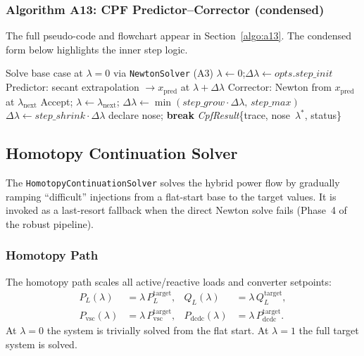 \subsubsection{Algorithm A13: CPF Predictor--Corrector (condensed)}
\label{algo:a13-inline}
The full pseudo-code and flowchart appear in Section~\ref{algo:a13}.
The condensed form below highlights the inner step logic.

\begin{algorithmic}[1]
  \State Solve base case at $\lambda{=}0$ via \texttt{NewtonSolver} (A3)
  \State $\lambda \gets 0$;\quad $\Delta\lambda \gets \mathit{opts.step\_init}$
    \State Predictor: secant extrapolation $\to x_{\mathrm{pred}}$ at $\lambda + \Delta\lambda$
    \State Corrector: Newton from $x_{\mathrm{pred}}$ at $\lambda_{\mathrm{next}}$
      \State Accept; $\lambda \gets \lambda_{\mathrm{next}}$;\quad
        $\Delta\lambda \gets \min(\mathit{step\_grow}\cdot\Delta\lambda,\,\mathit{step\_max})$
    \Else
      \State $\Delta\lambda \gets \mathit{step\_shrink}\cdot\Delta\lambda$
       declare nose; \textbf{break} \EndIf
    \EndIf
  \EndWhile
  \State \Return \textit{CpfResult}\{trace, nose~$\lambda^*$, status\}
\EndProcedure
\end{algorithmic}

\subsection{Homotopy Continuation Solver}
\label{sec:homotopy}

The \texttt{HomotopyContinuationSolver} solves the hybrid power flow by
gradually ramping ``difficult'' injections from a flat-start base to the target
values.  It is invoked as a last-resort fallback when the direct Newton solve
fails (Phase~4 of the robust pipeline).

\subsubsection{Homotopy Path}

The homotopy path scales all active/reactive loads and converter setpoints:
\begin{align}
P_{L}(\lambda) &= \lambda\,P_{L}^{\mathrm{target}}, &
Q_{L}(\lambda) &= \lambda\,Q_{L}^{\mathrm{target}}, \\
P_{\mathrm{vsc}}(\lambda) &= \lambda\,P_{\mathrm{vsc}}^{\mathrm{target}}, &
P_{\mathrm{dcdc}}(\lambda) &= \lambda\,P_{\mathrm{dcdc}}^{\mathrm{target}}.
\end{align}
At \(\lambda=0\) the system is trivially solved from the flat start.
At \(\lambda=1\) the full target system is solved.

